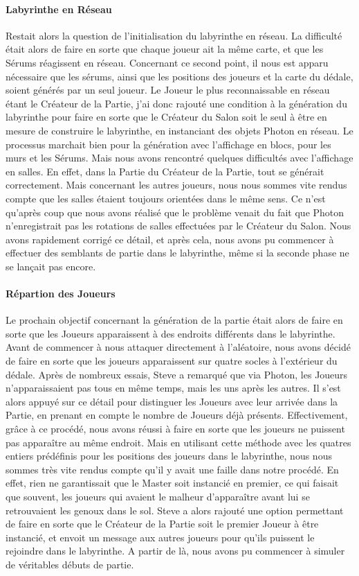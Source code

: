 \documentclass{article}
\begin{document}
\paragraph{Labyrinthe en Réseau}
Restait alors la question de l'initialisation du labyrinthe en réseau. La difficulté était alors de faire en sorte que chaque joueur ait la même carte, et que les Sérums réagissent en réseau. Concernant ce second point, il nous est apparu nécessaire que les sérums, ainsi que les positions des joueurs et la carte du dédale, soient générés par un seul joueur. Le Joueur le plus reconnaissable en réseau étant le Créateur de la Partie, j'ai donc rajouté une condition à la génération du labyrinthe pour faire en sorte que le Créateur du Salon soit le seul à être en mesure de construire le labyrinthe, en instanciant des objets Photon en réseau. Le processus marchait bien pour la génération avec l'affichage en blocs, pour les murs et les Sérums. Mais nous avons rencontré quelques difficultés avec l'affichage en salles. En effet, dans la Partie du Créateur de la Partie, tout se générait correctement. Mais concernant les autres joueurs, nous nous sommes vite rendus compte que les salles étaient toujours orientées dans le même sens. Ce n'est qu'après coup que nous avons réalisé que le problème venait du fait que Photon n'enregistrait pas les rotations de salles effectuées par le Créateur du Salon. Nous avons rapidement corrigé ce détail, et après cela, nous avons pu commencer à effectuer des semblants de partie dans le labyrinthe, même si la seconde phase ne se lançait pas encore.

\paragraph{Répartion des Joueurs}
Le prochain objectif concernant la génération de la partie était alors de faire en sorte que les Joueurs apparaissent à des endroits différents dans le labyrinthe. Avant de commencer à nous attaquer directement à l'aléatoire, nous avons décidé de faire en sorte que les joueurs apparaissent sur quatre socles à l'extérieur du dédale. Après de nombreux essais, Steve a remarqué que via Photon, les Joueurs n'apparaissaient pas tous en même temps, mais les uns après les autres. Il s'est alors appuyé sur ce détail pour distinguer les Joueurs avec leur arrivée dans la Partie, en prenant en compte le nombre de Joueurs déjà présents. Effectivement, grâce à ce procédé, nous avons réussi à faire en sorte que les joueurs ne puissent pas apparaître au même endroit. Mais en utilisant cette méthode avec les quatres entiers prédéfinis pour les positions des joueurs dans le labyrinthe, nous nous sommes très vite rendus compte qu'il y avait une faille dans notre procédé. En effet, rien ne garantissait que le Master soit instancié en premier, ce qui faisait que souvent, les joueurs qui avaient le malheur d'apparaître avant lui se retrouvaient les genoux dans le sol. Steve a alors rajouté une option permettant de faire en sorte que le Créateur de la Partie soit le premier Joueur à être instancié, et envoit un message aux autres joueurs pour qu'ils puissent le rejoindre dans le labyrinthe. A partir de là, nous avons pu commencer à simuler de véritables débuts de partie.
\end{document}

